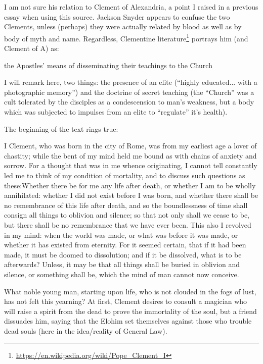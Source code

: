 I am not sure his relation to Clement of Alexandria, a point I raised in a previous essay when using this source. Jackson Snyder appears to confuse the two Clements, unless (perhaps) they were actually related by blood as well as by body of myth and name. Regardless, Clementine literature\footnote{\url{https://en.wikipedia.org/wiki/Pope\_Clement\_I}} portrays him (and Clement of A) as:

\begin{quotex}
the Apostles' means of disseminating their teachings to the Church
\end{quotex}

I will remark here, two things: the presence of an elite (``highly educated... with a photographic memory'') and the doctrine of secret teaching (the ``Church'' was a cult tolerated by the disciples as a condescension to man's weakness, but a body which was subjected to impulses from an elite to ``regulate'' it's health).

The beginning of the text rings true:

\begin{quotex}
I Clement, who was born in the city of Rome, was from my earliest age a lover of chastity; while the bent of my mind held me bound as with chains of anxiety and sorrow. For a thought that was in me whence originating, I cannot tell constantly led me to think of my condition of mortality, and to discuss such questions as these:Whether there be for me any life after death, or whether I am to be wholly annihilated: whether I did not exist before I was born, and whether there shall be no remembrance of this life after death, and so the boundlessness of time shall consign all things to oblivion and silence; so that not only shall we cease to be, but there shall be no remembrance that we have ever been. This also I revolved in my mind: when the world was made, or what was before it was made, or whether it has existed from eternity. For it seemed certain, that if it had been made, it must be doomed to dissolution; and if it be dissolved, what is to be afterwards? Unless, it may be that all things shall be buried in oblivion and silence, or something shall be, which the mind of man cannot now conceive.
\end{quotex}


What noble young man, starting upon life, who is not clouded in the fogs of lust, has not felt this yearning? At first, Clement desires to consult a magician who will raise a spirit from the dead to prove the immortality of the soul, but a friend dissuades him, saying that the Elohim set themselves against those who trouble dead souls (here in the idea/reality of General Law).


